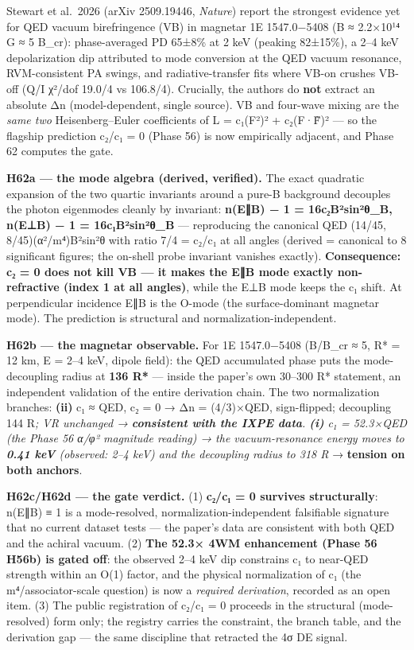 \documentclass[
]{article}
\begin{document}
Stewart et al.~2026 (arXiv 2509.19446, \emph{Nature}) report the
strongest evidence yet for QED vacuum birefringence (VB) in magnetar 1E
1547.0−5408 (B ≈ 2.2×10¹⁴ G ≈ 5 B\_cr): phase-averaged PD 65±8\% at 2
keV (peaking 82±15\%), a 2--4 keV depolarization dip attributed to mode
conversion at the QED vacuum resonance, RVM-consistent PA swings, and
radiative-transfer fits where VB-on crushes VB-off (Q/I χ²/dof 19.0/4 vs
106.8/4). Crucially, the authors do \textbf{not} extract an absolute Δn
(model-dependent, single source). VB and four-wave mixing are the
\emph{same two} Heisenberg--Euler coefficients of L = c₁(F²)² + c₂(F·F̃)²
--- so the flagship prediction c₂/c₁ = 0 (Phase 56) is now empirically
adjacent, and Phase 62 computes the gate.

\textbf{H62a --- the mode algebra (derived, verified).} The exact
quadratic expansion of the two quartic invariants around a pure-B
background decouples the photon eigenmodes cleanly by invariant:
\textbf{n(E∥B) − 1 = 16c₂B²sin²θ\_B, n(E⊥B) − 1 = 16c₁B²sin²θ\_B} ---
reproducing the canonical QED (14/45, 8/45)(α²/m⁴)B²sin²θ with ratio 7/4
= c₂/c₁ at all angles (derived = canonical to 8 significant figures; the
on-shell probe invariant vanishes exactly). \textbf{Consequence: c₂ = 0
does not kill VB --- it makes the E∥B mode exactly non-refractive (index
1 at all angles)}, while the E⊥B mode keeps the c₁ shift. At
perpendicular incidence E∥B is the O-mode (the surface-dominant magnetar
mode). The prediction is structural and normalization-independent.

\textbf{H62b --- the magnetar observable.} For 1E 1547.0−5408 (B/B\_cr ≈
5, R* = 12 km, E = 2--4 keV, dipole field): the QED accumulated phase
puts the mode-decoupling radius at \textbf{136 R*} --- inside the
paper's own 30--300 R* statement, an independent validation of the
entire derivation chain. The two normalization branches: \textbf{(ii)}
c₁ ≈ QED, c₂ = 0 → \textbar Δn\textbar{} = (4/3)×QED, sign-flipped;
decoupling 144 R\emph{; VR unchanged → \textbf{consistent with the IXPE
data}. \textbf{(i)} c₁ = 52.3×QED (the Phase 56 α/φ² magnitude reading)
→ the vacuum-resonance energy moves to \textbf{0.41 keV} (observed: 2--4
keV) and the decoupling radius to 318 R} → \textbf{tension on both
anchors}.

\textbf{H62c/H62d --- the gate verdict.} (1) \textbf{c₂/c₁ = 0 survives
structurally}: n(E∥B) ≡ 1 is a mode-resolved, normalization-independent
falsifiable signature that no current dataset tests --- the paper's data
are consistent with both QED and the achiral vacuum. (2) \textbf{The
52.3× 4WM enhancement (Phase 56 H56b) is gated off}: the observed 2--4
keV dip constrains c₁ to near-QED strength within an O(1) factor, and
the physical normalization of c₁ (the m⁴/associator-scale question) is
now a \emph{required derivation}, recorded as an open item. (3) The
public registration of c₂/c₁ = 0 proceeds in the structural
(mode-resolved) form only; the registry carries the constraint, the
branch table, and the derivation gap --- the same discipline that
retracted the 4σ DE signal.
\end{document}
